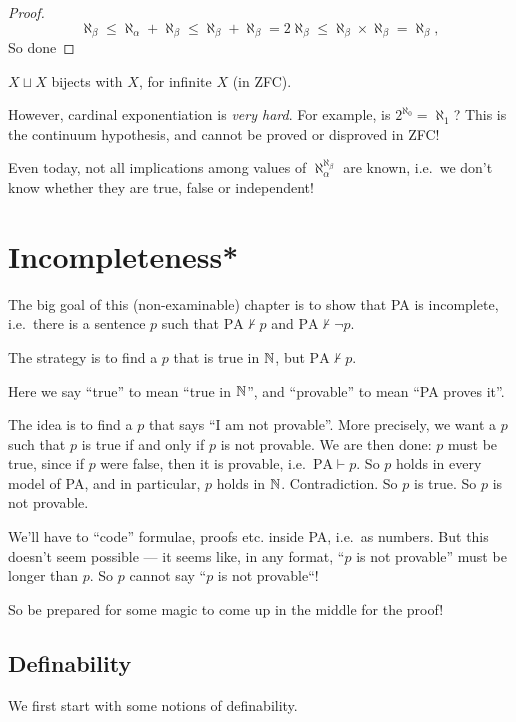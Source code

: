 \documentclass[a4paper]{article}
\begin{document}
\begin{proof}
  \[
    \aleph_\beta \leq \aleph_\alpha + \aleph_\beta \leq \aleph_\beta + \aleph_\beta = 2\aleph_\beta \leq \aleph_\beta\times \aleph_\beta = \aleph_\beta,
  \]
  So done
\end{proof}

\begin{eg}
  $X\sqcup X$ bijects with $X$, for infinite $X$ (in ZFC).
\end{eg}

However, cardinal exponentiation is \emph{very hard}. For example, is $2^{\aleph_0} = \aleph_1$? This is the continuum hypothesis, and cannot be proved or disproved in ZFC!

Even today, not all implications among values of $\aleph_\alpha^{\aleph_\beta}$ are known, i.e.\ we don't know whether they are true, false or independent!
\section{Incompleteness*}
The big goal of this (non-examinable) chapter is to show that PA is incomplete, i.e.\ there is a sentence $p$ such that $\mathrm{PA}\not\vdash p$ and $\mathrm{PA}\not\vdash \neg p$.

The strategy is to find a $p$ that is true in $\mathbb{N}$, but $\mathrm{PA}\not\vdash p$.

Here we say ``true'' to mean ``true in $\mathbb{N}$'', and ``provable'' to mean ``PA proves it''.

The idea is to find a $p$ that says ``I am not provable''. More precisely, we want a $p$ such that $p$ is true if and only if $p$ is not provable. We are then done: $p$ must be true, since if $p$ were false, then it is provable, i.e.\ $\mathrm{PA}\vdash p$. So $p$ holds in every model of PA, and in particular, $p$ holds in $\mathbb{N}$. Contradiction. So $p$ is true. So $p$ is not provable.

We'll have to ``code'' formulae, proofs etc. inside PA, i.e.\ as numbers. But this doesn't seem possible --- it seems like, in any format, ``$p$ is not provable'' must be longer than $p$. So $p$ cannot say ``$p$ is not provable``!

So be prepared for some magic to come up in the middle for the proof!

\subsection*{Definability}
We first start with some notions of definability.
\end{document}
